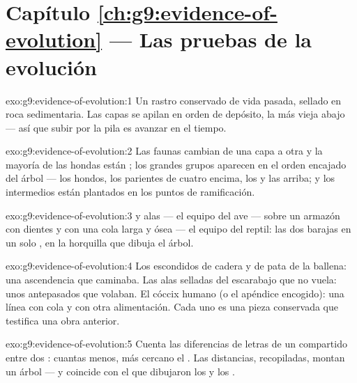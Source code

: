 \section*{Capítulo \ref{ch:g9:evidence-of-evolution} --- Las pruebas de la evolución}

\begin{solution}{exo:g9:evidence-of-evolution:1}
Un rastro conservado de vida pasada, sellado en roca sedimentaria. Las
capas se apilan en orden de depósito, la más vieja abajo --- así que
subir por la pila es avanzar en el tiempo.
\end{solution}

\begin{solution}{exo:g9:evidence-of-evolution:2}
Las faunas cambian de una capa a otra y la mayoría de las 
hondas están ; los grandes grupos aparecen en el orden
encajado del árbol --- los  hondos, los parientes de cuatro
 encima, los  y las  arriba; y los intermedios
están plantados en los puntos de ramificación.
\end{solution}

\begin{solution}{exo:g9:evidence-of-evolution:3}
 y alas --- el equipo del ave --- sobre un armazón con dientes y
con una cola larga y ósea --- el equipo del reptil: las dos barajas en
un solo , en la horquilla que dibuja el árbol.
\end{solution}

\begin{solution}{exo:g9:evidence-of-evolution:4}
Los  escondidos de cadera y de pata de la ballena: una
ascendencia que caminaba. Las alas selladas del escarabajo que no
vuela: unos antepasados que volaban. El cóccix humano (o el apéndice
encogido): una línea con cola y con otra alimentación. Cada uno es una
pieza conservada que testifica una obra anterior.
\end{solution}

\begin{solution}{exo:g9:evidence-of-evolution:5}
Cuenta las diferencias de letras de un  compartido entre dos
: cuantas menos, más cercano el . Las distancias,
recopiladas, montan un árbol --- y coincide con el que dibujaron los
 y los .
\end{solution}

